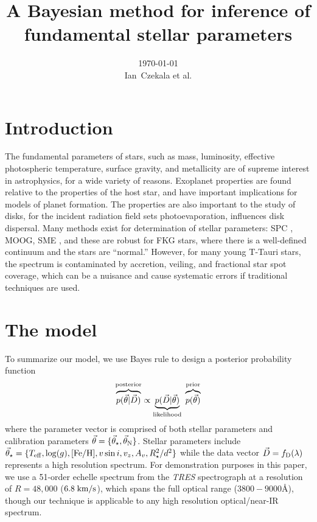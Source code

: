 \documentclass[preprint]{aastex} %
\newcommand{\vt}{\vec{\theta}}
\newcommand{\vstar}{\vt_{\star}}
\newcommand{\vN}{\vt_{\rm N}}
\newcommand{\fD}{f_{\rm D}}
\newcommand{\vD}{\vec{D}}
\begin{document}
\title{A Bayesian method for inference of fundamental stellar parameters}
\author{\today{}\\
\medskip
Ian~Czekala et al.
}




\section{Introduction}

The fundamental parameters of stars, such as mass, luminosity, effective photospheric temperature, surface gravity, and metallicity are of supreme interest in astrophysics, for a wide variety of reasons. Exoplanet properties are found relative to the properties of the host star, and have important implications for models of planet formation. The properties are also important to the study of disks, for the incident radiation field sets photoevaporation, influences disk dispersal. 
Many methods exist for determination of stellar parameters: SPC \citep{blj+12}, MOOG, SME \citep{vp96}, and these are robust for FKG stars, where there is a well-defined continuum and the stars are ``normal.'' However, for many young T-Tauri stars, the spectrum is contaminated by accretion, veiling, and fractional star spot coverage, which can be a nuisance and cause systematic errors if traditional techniques are used.

\section{The model}

To summarize our model, we use Bayes rule to design a posterior probability function
\begin{equation}
  \overbrace{p(\vt | \vD)}^{\rm posterior} \propto \underbrace{p(\vD | \vt)}_{\rm likelihood} \; \overbrace{p(\vt)}^{\rm prior}
  \label{eqn:posterior}
\end{equation}
where the parameter vector is comprised of both stellar parameters and calibration parameters $\vt = \{\vstar, \vN \}$. Stellar parameters include $\vstar = \{T_{\rm eff}, \log(g), [{\rm Fe}/{\rm H}], v \sin i, v_z, A_v, R_\star^2/d^2 \}$ while the data vector $\vD = \fD(\lambda)$ represents a high resolution spectrum. For demonstration purposes in this paper, we use a 51-order echelle spectrum from the \emph{TRES} spectrograph at a resolution of $R=48,000$ ($6.8\;{\rm km/s}$), which spans the full optical range ($3800-9000$\AA), though our technique is applicable to any high resolution optical/near-IR spectrum.
\end{document}

